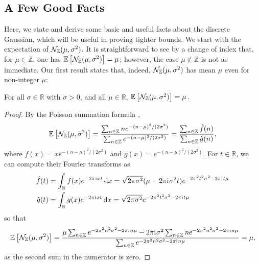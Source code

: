 \documentclass{jpc}
\newcommand{\ii}{\mathrm{i}\mkern1mu}
\newcommand{\ex}[2]{{\ifx&#1& \mathbb{E} \else
\underset{#1}{\mathbb{E}} \fi \left[#2\right]}}
\newcommand{\dx}[1][x]{\mathrm{d}#1}
\newcommand{\Z}{\mathbb{Z}}
\newcommand{\R}{\mathbb{R}}
\begin{document}
\subsection{A Few Good Facts}
\label{sec:good-facts}
Here, we state and derive some basic and useful facts about the discrete Gaussian, which will be useful in proving tighter bounds. 
We start with the expectation of $\discN(\mu,\sigma^2)$. It is straightforward to see by a change of index that, for $\mu\in\Z$, 
one has $\ex{}{\discN(\mu,\sigma^2)} = \mu$; however, the case $\mu\notin\Z$ is not as immediate. Our first result states that, 
indeed, $\discN(\mu,\sigma^2)$ has mean $\mu$ even for non-integer $\mu$:
\begin{fact}[Expectation]\label{fact:expectation}
    For all $\sigma \in \R$ with $\sigma>0$, and all $\mu\in\R$,
    $
       \ex{}{\discN(\mu,\sigma^2)} = \mu\,.
    $
\end{fact}
\begin{proof}
By the Poisson summation formula \citep{poisson,poisson2},
\[
        \ex{}{\discN(\mu,\sigma^2)}
        = \frac{\sum_{n\in\Z} n e^{-(n-\mu)^2/(2\sigma^2)}}{\sum_{n\in\Z} e^{-(n-\mu)^2/(2\sigma^2)}}
        = \frac{\sum_{n\in\Z} \hat{f}(n)}{\sum_{n\in\Z} \hat{g}(n)},
\]
where $f(x) = xe^{-(n-\mu)^2/(2\sigma^2)}$ and $g(x) = e^{-(n-\mu)^2/(2\sigma^2)}$. For $t\in\R$, we can compute their Fourier transforms as
\begin{align*}
    \hat{f}(t) &= \int_{\R} f(x) e^{-2\pi\ii{}x t}\,\dx = \sqrt{2\pi\sigma^2}(\mu-2\pi\ii{}\sigma^2 t) e^{-2\pi^2t^2\sigma^2 - 2\pi\ii{}t \mu}\\
    \hat{g}(t) &= \int_{\R} g(x) e^{-2\pi\ii{}x t}\,\dx = \sqrt{2\pi\sigma^2}e^{-2\pi^2t^2\sigma^2 - 2\pi\ii{}t \mu}
\end{align*}
so that
\[
        \ex{}{\discN(\mu,\sigma^2)}
        = \frac{\mu \sum_{n\in\Z}  e^{-2\pi^2n^2\sigma^2 - 2\pi\ii{}n \mu}  -  2\pi\ii{}\sigma^2\sum_{n\in\Z} n e^{-2\pi^2n^2\sigma^2 - 2\pi\ii{}n \mu} }{\sum_{n\in\Z} e^{-2\pi^2n^2\sigma^2 - 2\pi\ii{}n \mu} }
        = \mu,
\]
as the second sum in the numerator is zero.
\end{proof}
\end{document}
